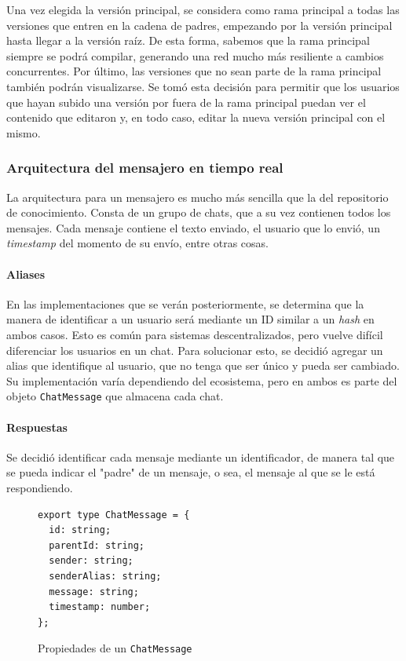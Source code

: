 Una vez elegida la versión principal, se considera como rama principal a todas las versiones que entren en la cadena de padres, empezando por la versión principal hasta llegar a la versión raíz. De esta forma, sabemos que la rama principal siempre se podrá compilar, generando una red mucho más resiliente a cambios concurrentes. 
Por último, las versiones que no sean parte de la rama principal también podrán visualizarse. Se tomó esta decisión para permitir que los usuarios que hayan subido una versión por fuera de la rama principal puedan ver el contenido que editaron y, en todo caso, editar la nueva versión principal con el mismo.

\subsubsection{Arquitectura del mensajero en tiempo real}

La arquitectura para un mensajero es mucho más sencilla que la del repositorio de conocimiento. Consta de un grupo de chats, que a su vez contienen todos los mensajes. Cada mensaje contiene el texto enviado, el usuario que lo envió, un \textit{timestamp} del momento de su envío, entre otras cosas.

\paragraph{Aliases} En las implementaciones que se verán posteriormente, se determina que la manera de identificar a un usuario será mediante un ID similar a un \textit{hash} en ambos casos. Esto es común para sistemas descentralizados, pero vuelve difícil diferenciar los usuarios en un chat. Para solucionar esto, se decidió agregar un alias que identifique al usuario, que no tenga que ser único y pueda ser cambiado. Su implementación varía dependiendo del ecosistema, pero en ambos es parte del objeto \texttt{ChatMessage} que almacena cada chat.

\paragraph{Respuestas} Se decidió identificar cada mensaje mediante un identificador, de manera tal que se pueda indicar el "padre" de un mensaje, o sea, el mensaje al que se le está respondiendo.

\begin{figure}[H]
    \centering
    \begin{minipage}{0.9\linewidth}
        \lstset{
            basicstyle=\ttfamily\small,
            frame=single,
            captionpos=b
        }
        \begin{lstlisting}
export type ChatMessage = {
  id: string;
  parentId: string;
  sender: string;
  senderAlias: string;
  message: string;
  timestamp: number;
};\end{lstlisting}
    \end{minipage}
    \caption{Propiedades de un \texttt{ChatMessage}}
    \label{fig:chat-message}
\end{figure}
